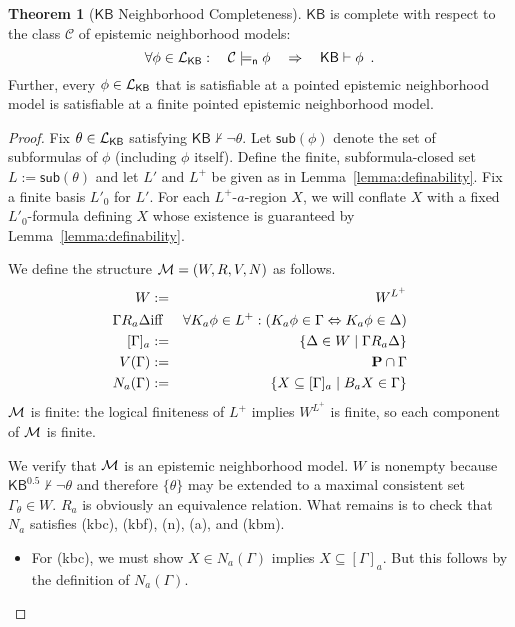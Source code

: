 \documentclass[12pt]{article}
\theoremstyle{definition}
\newtheorem{theorem}{Theorem}[section]
\newcommand{\M}{{\cal M}}      %
\newcommand{\Prop}{{\bf P}}    %
\newcommand{\Lang}{{\cal L}}   %
\newcommand{\KB}{{\mathsf{KB}}}                        %
\newcommand{\KBeq}{{\mathsf{KB}^{\mathsf{0.5}}}}       %
\newcommand{\modelsn}{\models_{\mathsf{n}}}                  %
\begin{document}
\begin{theorem}[$\KB$ Neighborhood Completeness]
  \label{theorem:KB-neighborhood-completeness}
  $\KB$ is complete with respect to the class $\mathcal{C}$ of
  epistemic
  neighborhood models:
  \[
  \forall\phi\in\Lang_\KB:\quad
  \mathcal{C}\modelsn\phi
  \quad\Rightarrow\quad
  \KB\vdash\phi
  \enspace.
  \]
  Further, every $\phi\in\Lang_\KB$ that is satisfiable at a pointed
  epistemic neighborhood model is satisfiable at a finite pointed
  epistemic neighborhood model.
\end{theorem}
\begin{proof}
  Fix $\theta\in\Lang_\KB$ satisfying
  $\KB\nvdash\lnot\theta$.  Let $\mathsf{sub}(\phi)$ denote the set of subformulas
  of $\phi$ (including $\phi$ itself).  Define the finite, subformula-closed set
  $L:=\mathsf{sub}(\theta)$
  and let $L'$ and $L^+$ be given as in Lemma~\ref{lemma:definability}.
  Fix a finite basis $L'_0$ for $L'$.  For each $L^+$-$a$-region $X$,
  we will conflate $X$ with a fixed
  $L'_0$-formula defining $X$ whose 
  existence is guaranteed by Lemma~\ref{lemma:definability}.

  We define the structure $\M=(W,R,V,N)$ as follows.
  \begin{eqnarray*}
    W &:=& W^{L^+}
    \\
    \Gamma R_a\Delta
    &\text{iff}&
    \forall K_a\phi\in L^+:(K_a\phi\in\Gamma\Leftrightarrow K_a\phi\in\Delta)
    \\{}
    [\Gamma]_a &:=& \{\Delta\in W\mid \Gamma R_a\Delta\}
    \\
    V(\Gamma) &:=& \Prop\cap\Gamma
    \\
    N_a(\Gamma) &:=&  \{X\subseteq[\Gamma]_a\mid B_aX\in\Gamma\}
  \end{eqnarray*}
  $\M$ is finite: the logical finiteness of $L^+$ implies
  $W^{L^+}$ is finite, so each component of $\M$ is finite.

  We verify that $\M$ is an epistemic neighborhood model.  $W$ is
  nonempty because $\KBeq\nvdash\lnot\theta$ and therefore
  $\{\theta\}$ may be extended to a maximal consistent set
  $\Gamma_\theta\in W$.
  $R_a$ is obviously an equivalence relation.  What
  remains is to check that $N_a$ satisfies (kbc), (kbf), (n), (a),
  and (kbm).
  \begin{itemize}
  \item For (kbc), we must show $X\in N_a(\Gamma)$ implies
    $X\subseteq[\Gamma]_a$.  But this follows by the definition of
    $N_a(\Gamma)$.


\end{itemize}
\end{proof}
\end{document}
